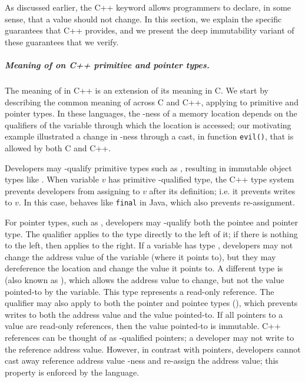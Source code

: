 As discussed earlier, the C++ \const{} keyword allows programmers to declare,
in some sense, that a value should not change.
In this section, we explain the specific guarantees that C++ provides, and we
present the deep immutability variant of these guarantees that we verify.

\subparagraph*{Meaning of \const{} on C++ primitive and pointer types.}

The meaning of \const{} in C++ is an extension of its meaning in C.
We start by describing the common meaning of \const{} across C and C++, applying
to primitive and pointer types.
In these languages, the \const{}-ness of a memory location depends on the
qualifiers of the variable through which the location is accessed; our
motivating example illustrated a change in \const{}-ness through a cast, in
function \texttt{evil()}, that is allowed by both C and C++.

Developers may \const{}-qualify primitive types such as ,
resulting in immutable object types like .
When variable $v$ has primitive \const{}-qualified type, the C++ type system
prevents developers from assigning to $v$ after its definition; i.e. it
prevents writes to $v$.
In this case, \const{} behaves like \texttt{final} in Java, which also
prevents re-assignment.

For pointer types, such as , developers may
\const{}-qualify both the pointee and pointer type.
The \const{} qualifier applies to the type directly to the left of it; if there
is nothing to the left, then \const{} applies to the right.
If a variable has type , developers may not change
the address value of the variable (where it points to), but they may dereference
the location and change the value it points to.
A different type is  (also known as
), which allows the address value to
change, but not the value pointed-to by the variable.
This type represents a read-only reference.
The \const{} qualifier may also apply to both the pointer and pointee types
(), which prevents writes to
both the address value and the value pointed-to.
If all pointers to a value are read-only references, then the value pointed-to
is immutable.
C++ references can be thought of as \const{}-qualified pointers; a developer may
not write to the reference address value.
However, in contrast with pointers, developers cannot cast away reference
address value \const{}-ness and re-assign the address value; this property is
enforced by the language.


